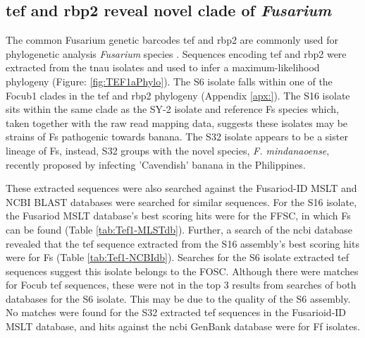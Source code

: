 \subsection{\acl{tef} and \acl{rbp2} reveal novel clade of \textit{Fusarium}}

The common Fusarium genetic barcodes \acf{tef} and \acf{rbp2} are commonly used for phylogenetic analysis \textit{Fusarium} species \parencite{Edel-Hermann2019}. Sequences encoding \ac{tef}  and \acf{rbp2} were extracted from the \ac{tnau} isolates and used to infer a maximum-likelihood phylogeny (Figure: \ref{fig:TEF1aPhylo}). The S6 isolate falls within one of the \ac{Focub1} clades in the \acs{tef} and \ac{rbp2} phylogeny (Appendix \ref{apx:}). The S16 isolate sits within the same clade as the SY-2 isolate and reference \ac{Fs} species which, taken together with the raw read mapping data, suggests these isolates may be strains of \ac{Fs} pathogenic towards banana. The S32 isolate appears to be a sister lineage of \ac{Fs}, instead, S32 groups with the novel species, \textit{F. mindanaoense}, recently proposed by  \textcite{Nozawa2023} infecting 'Cavendish' banana in the Philippines. 

These extracted sequences were also searched against the Fusariod-ID MSLT and NCBI BLAST databases were searched for similar sequences. For the S16 isolate, the Fusariod MSLT database's best scoring hits were for the \ac{FFSC}, in which \ac{Fs} can be found (Table \ref{tab:Tef1-MLSTdb}). Further, a search of the \ac{ncbi} database revealed that the \ac{tef} sequence extracted from the S16 assembly's best scoring hits were for \ac{Fs} (Table \ref{tab:Tef1-NCBIdb}). Searches for the S6 isolate extracted \ac{tef} sequences suggest this isolate belongs to the \ac{FOSC}. Although there were matches for \ac{Focub} \ac{tef} sequences, these were not in the top 3 results from searches of both databases for the S6 isolate. This may be due to the quality of the S6 assembly. No matches were found for the S32 extracted \ac{tef} sequences in the Fusarioid-ID MSLT database, and hits against the \ac{ncbi} GenBank database were for \ac{Ff} isolates. 



